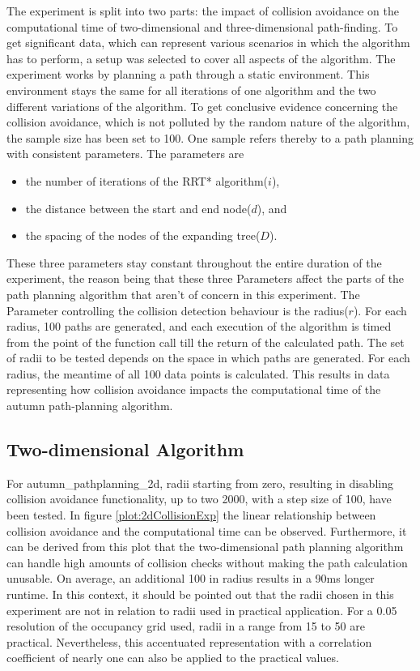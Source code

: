 The experiment is split into two parts: the impact of collision avoidance on the computational time of two-dimensional and three-dimensional path-finding.
To get significant data, which can represent various scenarios in which the algorithm has to perform, a setup was selected to cover all aspects of the algorithm. The experiment works by planning a path through a static environment. This environment stays the same for all iterations of one algorithm and the two different variations of the algorithm. To get conclusive evidence concerning the collision avoidance, which is not polluted by the random nature of the algorithm, the sample size has been set to 100. \newline One sample refers thereby to a path planning with consistent parameters. The parameters are
\begin{itemize}
	\item the number of iterations of the RRT* algorithm($i$),
	\item the distance between the start and end node($d$), and
	\item the spacing of the nodes of the expanding tree($D$).
\end{itemize}
These three parameters stay constant throughout the entire duration of the experiment, the reason being that these three Parameters affect the parts of the path planning algorithm that aren't of concern in this experiment. The Parameter controlling the collision detection behaviour is the radius($r$).
For each radius, 100 paths are generated, and each execution of the algorithm is timed from the point of the function call till the return of the calculated path. 
The set of radii to be tested depends on the space in which paths are generated.
For each radius, the meantime of all 100 data points is calculated. This results in data representing how collision avoidance impacts the computational time of the autumn path-planning algorithm.

\subsection{Two-dimensional Algorithm}

For autumn\_pathplanning\_2d, radii starting from zero, resulting in disabling collision avoidance functionality, up to two 2000, with a step size of 100, have been tested. In figure \ref{plot:2dCollisionExp} the linear relationship between collision avoidance and the computational time can be observed. Furthermore, it can be derived from this plot that the two-dimensional path planning algorithm can handle high amounts of collision checks without making the path calculation unusable. On average, an additional 100 in radius results in a 90ms longer runtime. In this context, it should be pointed out that the radii chosen in this experiment are not in relation to radii used in practical application. For a 0.05 resolution of the occupancy grid used, radii in a range from 15 to 50 are practical. Nevertheless, this accentuated representation with a correlation coefficient of nearly one can also be applied to the practical values.   

